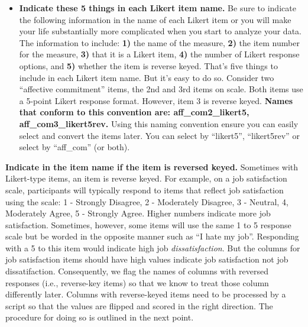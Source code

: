 \documentclass[
]{krantz}
\begin{document}
\begin{itemize}
\item
  \textbf{Indicate these 5 things in each Likert item name.} Be sure to indicate the following information in the name of each Likert item or you will make your life substantially more complicated when you start to analyze your data. The information to include: \textbf{1)} the name of the measure, \textbf{2)} the item number for the measure, \textbf{3)} that it is a Likert item, \textbf{4)} the number of Likert response options, and \textbf{5)} whether the item is reverse keyed. That's five things to include in each Likert item name. But it's easy to do so. Consider two ``affective commitment'' items, the 2nd and 3rd items on scale. Both items use a 5-point Likert response format. However, item 3 is reverse keyed. \textbf{Names that conform to this convention are: aff\_com2\_likert5, aff\_com3\_likert5rev.} Using this naming convention ensure you can easily select and convert the items later. You can select by ``likert5'', ``likert5rev'' or select by ``aff\_com'' (or both).
\end{itemize}

\textbf{Indicate in the item name if the item is reversed keyed. } Sometimes with Likert-type items, an item is reverse keyed. For example, on a job satisfaction scale, participants will typically respond to items that reflect job satisfaction using the scale: 1 - Strongly Disagree, 2 - Moderately Disagree, 3 - Neutral, 4, Moderately Agree, 5 - Strongly Agree. Higher numbers indicate more job satisfaction. Sometimes, however, some items will use the same 1 to 5 response scale but be worded in the opposite manner such as ``I hate my job''. Responding with a 5 to this item would indicate high job \emph{dissatisfaction}. But the columns for job satisfaction items should have high values indicate job satisfaction not job dissatifaction. Consequently, we flag the names of columns with reversed responses (i.e., reverse-key items) so that we know to treat those column differently later. Columns with reverse-keyed items need to be processed by a script so that the values are flipped and scored in the right direction. The procedure for doing so is outlined in the next point.
\end{document}
